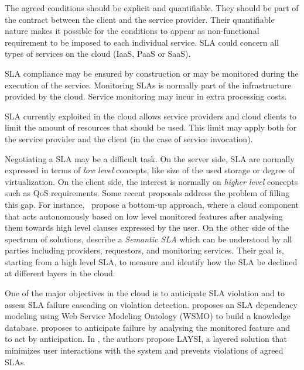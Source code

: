 The agreed conditions should be explicit and quantifiable.
They should be part of the contract between the client and the service provider.
Their quantifiable nature makes it possible for the conditions to appear as non-functional requirement to be imposed to each individual service.
SLA could concern all types of services on the cloud (IaaS, PaaS or SaaS).

SLA compliance may be ensured by construction or may be monitored during the execution of the service.
Monitoring SLAs is normally part of the infrastructure provided by the cloud.
Service monitoring may incur in extra processing costs.

SLA currently exploited in the cloud allows service providers and cloud clients to limit the amount of resources that should be used.
This limit may apply both for the service provider and the client (in the case of service invocation). 

Negotiating a SLA may be a difficult task.
On the server side, SLA are normally expressed in terms of \textit{low level} concepts, like size of the used storage or degree of virtualization. 
On the client side, the interest is normally on \textit{higher level} concepts such as QoS requirements.
Some recent proposals address the problem of filling this gap.  
For instance,~\cite{5547150} propose a bottom-up approach, where a cloud component that acts autonomously based on low level monitored features after analysing them towards high level clauses expressed by the user. 
On the other side of the spectrum of solutions, \cite{Dastjerdi:2012:DOA:2275356.2275360} describe a \textit{Semantic SLA} which can be understood by all parties including providers, requestors, and monitoring services.
Their goal is, starting from a high level SLA, to measure and identify how the SLA be declined at different layers in the cloud.

{\color{red}
One of the major objectives in the cloud is to anticipate SLA violation and to assess SLA failure cascading on violation detection. 
\cite{Dastjerdi:2012:DOA:2275356.2275360} proposes an SLA dependency modeling using Web Service Modeling Ontology (WSMO) to build a knowledge database.  
\cite{5547150} proposes to anticipate failure by analysing the monitored feature and to act by anticipation. 
In \cite{5614035}, the authors propose LAYSI, a layered solution that minimizes user interactions with the system and prevents violations of agreed SLAs. 
}

